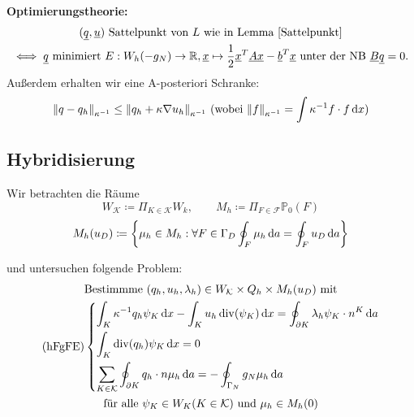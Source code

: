\textbf{Optimierungstheorie:} 
\begin{gather*}
	(\underline{q}, \underline{u}) \text{ Sattelpunkt von } L  \text { wie in Lemma \ref{Sattelpunkt}}\\
	\iff \underline{q} \text{ minimiert } E:W_h(-g_N) \to \mathbb{R} , \underline{x} \mapsto \frac{1}{2} \underline{x}^T \underline{A} \underline{x} - \underline{b}^T \underline{x} \text{ unter der NB } \underline{B} \underline{q} = 0.
\end{gather*}
Außerdem erhalten wir eine A-posteriori Schranke:
\[ \norm{q-q_h}_{\kappa^{-1}} \leq \norm{q_h + \kappa \nabla u_h}_{\kappa^{-1}} \ (\text{wobei } \norm{f}_{\kappa^{-1}} = \int \kappa^{-1} f \cdot f \mathop{}\!\mathrm{d} x)  \]

\subsection{Hybridisierung}


Wir betrachten die Räume
\[ W_\mathcal{K} \coloneqq \Pi_{K \in \mathcal{K}} W_k, \qquad M_h \coloneqq \Pi_{F \in \mathcal{F}} \mathbb{P}_0(F) \]
\[ M_h(u_D) \coloneqq \left\{ \mu_h \in M_h:\forall  F \in \Gamma_D \oint_F \mu_h \mathop{}\!\mathrm{d} a = \oint_F u_D \mathop{}\!\mathrm{d} a  \right\}\]

und untersuchen folgende Problem:
\begin{gather*}
	\text{Bestimmme } (q_h,u_h, \lambda_h) \in W_\mathcal{K} \times Q_h \times M_h(u_D) \text{ mit}\\
	\operatorname{(hF gFE)}\begin{dcases}
		\int_K \kappa^{-1} q_h \psi_K \mathop{}\!\mathrm{d} x - \int_K u_h \operatorname{div}(\psi_K) \mathop{}\!\mathrm{d} x = \oint_{\partial K} \lambda_h \psi_K \cdot n^K \mathop{}\!\mathrm{d} a \\
		\int_K \operatorname{div}(q_h) \psi_K \mathop{}\!\mathrm{d} x = 0\\
		\sum_{K\in \mathcal{K}} \oint_{\partial K} q_h \cdot n \mu_h \mathop{}\!\mathrm{d} a = - \oint_{\Gamma_N} g_N \mu_h \mathop{}\!\mathrm{d} a
	\end{dcases}\\
	\text{für alle } \psi_K \in W_K (K \in \mathcal{K}) \text{ und } \mu_h \in M_h(0)
\end{gather*}


